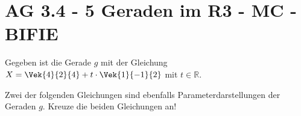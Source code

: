 \section{AG 3.4 - 5 Geraden im R3 - MC - BIFIE}

\begin{beispiel}[AG 3.4]{1} %
Gegeben ist die Gerade $g$ mit der Gleichung $X=\Vek{4}{2}{4}+t\cdot\Vek{1}{-1}{2}$ mit $t\in\mathbb{R}$.

Zwei der folgenden Gleichungen sind ebenfalls Parameterdarstellungen der Geraden $g$. Kreuze die beiden Gleichungen an!
\end{beispiel}
